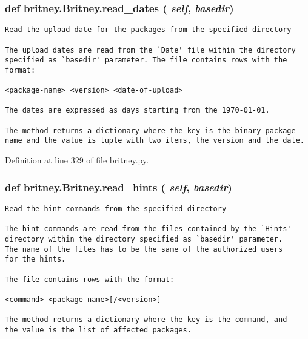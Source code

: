 \subsubsection{\setlength{\rightskip}{0pt plus 5cm}def britney.Britney.read\_\-dates ( {\em self},  {\em basedir})}\label{classbritney_1_1Britney_085af5ac906813ea40fc2e623748f517}




\footnotesize\begin{verbatim}Read the upload date for the packages from the specified directory

The upload dates are read from the `Date' file within the directory
specified as `basedir' parameter. The file contains rows with the
format:

<package-name> <version> <date-of-upload>

The dates are expressed as days starting from the 1970-01-01.

The method returns a dictionary where the key is the binary package
name and the value is tuple with two items, the version and the date.
\end{verbatim}
\normalsize
 

Definition at line 329 of file britney.py.
\subsubsection{\setlength{\rightskip}{0pt plus 5cm}def britney.Britney.read\_\-hints ( {\em self},  {\em basedir})}\label{classbritney_1_1Britney_46d535f617fcf1faaaf5d841ea23c184}




\footnotesize\begin{verbatim}Read the hint commands from the specified directory

The hint commands are read from the files contained by the `Hints'
directory within the directory specified as `basedir' parameter. 
The name of the files has to be the same of the authorized users
for the hints.

The file contains rows with the format:

<command> <package-name>[/<version>]

The method returns a dictionary where the key is the command, and
the value is the list of affected packages.
\end{verbatim}
\normalsize
 

